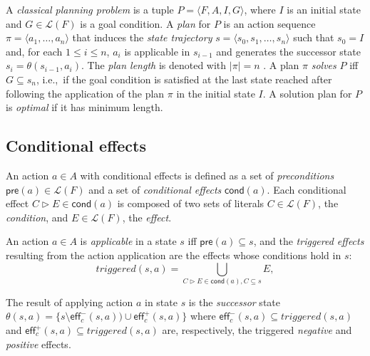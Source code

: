 \documentclass[letterpaper]{article} %
\newcommand{\tup}[1]{{\langle #1 \rangle}}
\newcommand{\pre}{\mathsf{pre}}     %
\newcommand{\eff}{\mathsf{eff}}     %
\newcommand{\cond}{\mathsf{cond}}   %
\begin{document}
A {\em classical planning problem} is a tuple $P=\tup{F,A,I,G}$, where $I$ is an initial state and $G\in\mathcal{L}(F)$ is a goal condition. A {\em plan} for $P$ is an action sequence $\pi=\tup{a_1, \ldots, a_n}$ that induces the {\em state trajectory} $s=\tup{s_0, s_1, \ldots, s_n}$ such that $s_0=I$ and, for each {\small $1\leq i\leq n$}, $a_i$ is applicable in $s_{i-1}$ and generates the successor state $s_i=\theta(s_{i-1},a_i)$. The {\em plan length} is denoted with $|\pi|=n$ . A plan $\pi$ {\em solves} $P$ iff $G\subseteq s_n$, i.e.,~if the goal condition is satisfied at the last state reached after following the application of the plan $\pi$ in the initial state $I$. A solution plan for $P$ is {\em optimal} if it has minimum length.

\subsection{Conditional effects}
An action $a\in A$ with conditional effects is defined as a set of {\em preconditions} $\pre(a)\in\mathcal{L}(F)$ and a set of {\em conditional effects} $\cond(a)$. Each conditional effect $C\rhd E\in\cond(a)$ is composed of two sets of literals $C\in\mathcal{L}(F)$, the {\em condition}, and $E\in\mathcal{L}(F)$, the {\em effect}.

An action $a\in A$ is {\em applicable} in a state $s$ iff $\pre(a)\subseteq s$, and the {\em triggered effects} resulting from the action application are the effects whose conditions hold in $s$:
\[
triggered(s,a)=\bigcup_{C\rhd E\in\cond(a),C\subseteq s} E,
\]

The result of applying action $a$ in state $s$ is the {\em successor} state $\theta(s,a)=\{s\setminus\eff_c^-(s,a))\cup\eff_c^+(s,a)\}$ where $\eff_c^-(s,a)\subseteq triggered(s,a)$ and $\eff_c^+(s,a)\subseteq triggered(s,a)$ are, respectively, the triggered {\em negative} and {\em positive} effects.
\end{document}
